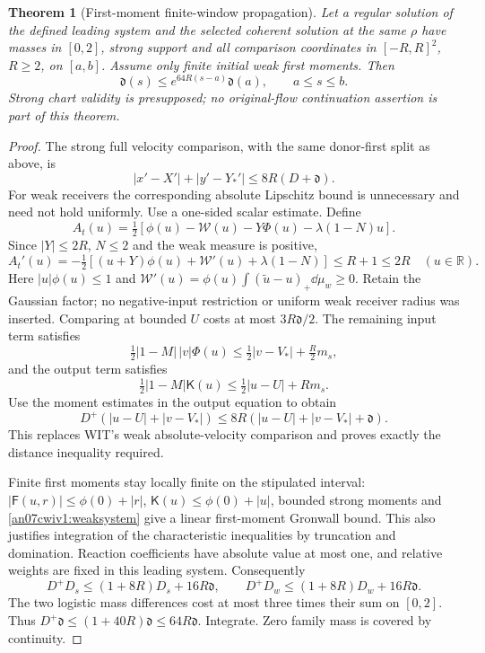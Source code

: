 \documentclass[11pt]{article}
\numberwithin{equation}{section}
\newtheorem{theorem}{Theorem}[section]
\theoremstyle{remark}\newtheorem{remark}[theorem]{Remark}
\newcommand{\Kfun}{\mathsf K}\newcommand{\Ffun}{\mathsf F}
\newcommand{\dist}{\mathfrak d}
\begin{document}
\begin{theorem}[First-moment finite-window propagation]
\label{an07cwiv1:propagation}
Let a regular solution of the defined leading system and the
selected coherent solution at the same \(\rho\) have masses
in \([0,2]\), strong support and all comparison coordinates
in \([-R,R]^2\), \(R\ge2\), on \([a,b]\). Assume only finite
initial weak first moments. Then
\begin{equation}
 \dist(s)\le e^{64R(s-a)}\dist(a),\qquad a\le s\le b.
 \label{an07cwiv1:propbound}
\end{equation}
Strong chart validity is presupposed; no original-flow
continuation assertion is part of this theorem.
\end{theorem}
\begin{proof}
The strong full velocity comparison, with the same donor-first
split as above, is
\[
 |x'-X'|+|y'-Y_*'|\le8R(D+\dist).
 \]
For weak receivers the corresponding absolute Lipschitz bound
is unnecessary and need not hold uniformly. Use a one-sided
scalar estimate. Define
\[
 A_t(u)=\tfrac12[\phi(u)-\mathcal W(u)-Y\Phi(u)
                                      -\lambda(1-N)u].
 \]
Since \(|Y|\le2R\), \(N\le2\) and the weak measure is positive,
\begin{equation}
 A_t'(u)=-\tfrac12[(u+Y)\phi(u)
            +\mathcal W'(u)+\lambda(1-N)]
       \le R+1\le2R\quad(u\in\mathbb R).
 \label{an07cwiv1:onesided}
\end{equation}
Here \(|u|\phi(u)\le1\) and
\(\mathcal W'(u)=\phi(u)\int(\widetilde u-u)_+\dd\mu_w\ge0\).
Retain the Gaussian factor; no negative-input restriction or
uniform weak receiver radius was inserted.
Comparing at bounded \(U\) costs at most \(3R\dist/2\).
The remaining input term satisfies
\[
 \tfrac12|1-M|\,|v|\Phi(u)
 \le\tfrac12|v-V_*|+\tfrac R2m_s ,
 \]
and the output term satisfies
\[
 \tfrac12|1-M|\Kfun(u)
 \le\tfrac12|u-U|+Rm_s .
 \]
Use the moment estimates in the output equation to obtain
\[
 D^+(|u-U|+|v-V_*|)
       \le8R(|u-U|+|v-V_*|+\dist).
 \]
This replaces WIT's weak absolute-velocity comparison and
proves exactly the distance inequality required.

Finite first moments stay locally finite on the stipulated
interval: \(|\Ffun(u,r)|\le\phi(0)+|r|\),
\(\Kfun(u)\le\phi(0)+|u|\), bounded strong moments and
\eqref{an07cwiv1:weaksystem} give a linear first-moment
Gronwall bound. This also justifies integration of the
characteristic inequalities by truncation and domination.
Reaction coefficients have absolute value at most one,
and relative weights are fixed in this leading system.
Consequently
\[
 D^+D_s\le(1+8R)D_s+16R\dist,\qquad
 D^+D_w\le(1+8R)D_w+16R\dist .
 \]
The two logistic mass differences cost at most three times
their sum on \([0,2]\). Thus
\(D^+\dist\le(1+40R)\dist\le64R\dist\).
Integrate. Zero family mass is covered by continuity.
\end{proof}
\end{document}

